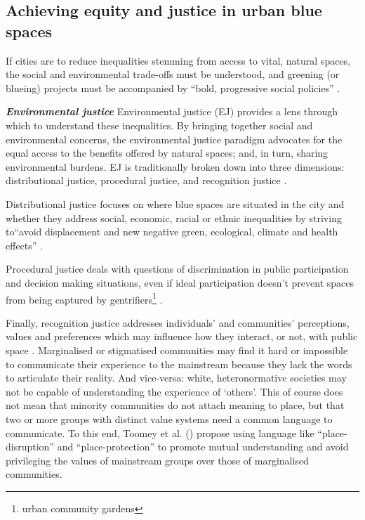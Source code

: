 \documentclass{article}
\newcommand{\bisection}[1]{\textbf{\textit{#1}}}
\begin{document}
\subsection{Achieving equity and justice in urban blue spaces}

If cities are to reduce inequalities stemming from access to vital, natural spaces, the social and environmental trade-offs must be understood, and greening (or blueing) projects must be accompanied by ``bold, progressive social policies'' \parencite{anguelovski2021green}.

\bisection{Environmental justice}
Environmental justice (EJ) provides a lens through which to understand these inequalities. By bringing together social and environmental concerns, the environmental justice paradigm advocates for the equal access to the benefits offered by natural spaces; and, in turn, sharing environmental burdens. 
EJ is traditionally broken down into three dimensions: distributional justice, procedural justice, and recognition justice \parencite{todo:cite schlosberg}.

Distributional justice focuses on where blue spaces are situated in the city and whether they address social, economic, racial or ethnic inequalities by striving to``avoid displacement and new negative green, ecological, climate and health effects'' \parencite{anguelovski2020expanding}.

Procedural justice deals with questions of discrimination in public participation and decision making situations, even if ideal participation doesn't prevent spaces from being captured by gentrifiers\footnote{urban community gardens} \parencite{anguelovski2020expanding}. 

Finally, recognition justice addresses individuals' and communities’ perceptions, values and preferences which may influence how they interact, or not, with public space \parencite{anguelovski2020expanding}.
Marginalised or stigmatised communities may find it hard or impossible to communicate their experience to the mainstream because they lack the words to articulate their reality. And vice-versa: white, heteronormative societies may not be capable of understanding the experience of `others'. This of course does not mean that minority communities do not attach meaning to place, but that two or more groups with distinct value systems need a common language to communicate. To this end, Toomey et al. (\citeyear{toomey2021place}) propose using language like ``place-disruption'' and ``place-protection'' to promote mutual understanding and avoid privileging the values of mainstream groups over those of marginalised communities.
\end{document}
